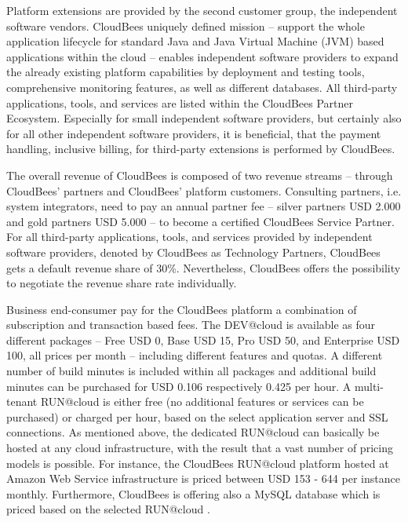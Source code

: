 Platform extensions are provided by the second customer group, the independent software vendors. CloudBees uniquely defined mission -- support the whole application lifecycle for standard Java and Java Virtual Machine (JVM) based applications within the cloud -- enables independent software providers to expand the already existing platform capabilities by deployment and testing tools, comprehensive monitoring features, as well as different databases. All third-party applications, tools, and services are listed within the CloudBees Partner Ecosystem. Especially for small independent software providers, but certainly also for all other independent software providers, it is beneficial, that the payment handling, inclusive billing, for third-party extensions is performed by CloudBees.

The overall revenue of CloudBees is composed of two revenue streams -- through CloudBees' partners and CloudBees' platform customers. Consulting partners, i.e. system integrators, need to pay an annual partner fee -- silver partners USD 2.000 and gold partners USD 5.000 -- to become a certified CloudBees Service Partner. For all third-party applications, tools, and services provided by independent software providers, denoted by CloudBees as Technology Partners, CloudBees gets a default revenue share of 30\%. Nevertheless, CloudBees offers the possibility to negotiate the revenue share rate individually.

Business end-consumer pay for the CloudBees platform a combination of subscription and transaction based fees. The DEV@cloud is available as four different packages -- Free USD 0, Base USD 15, Pro USD 50, and Enterprise USD 100, all prices per month -- including different features and quotas. A different number of build minutes is included within all packages and additional build minutes can be purchased for USD 0.106 respectively 0.425 per hour. A multi-tenant RUN@cloud is either free (no additional features or services can be purchased) or charged per hour, based on the select application server and SSL connections. As mentioned above, the dedicated RUN@cloud can basically be hosted at any cloud infrastructure, with the result that a vast number of pricing models is possible. For instance, the CloudBees RUN@cloud platform hosted at Amazon Web Service infrastructure is priced between USD 153 - 644 per instance monthly. Furthermore, CloudBees is offering also a MySQL database which is priced based on the selected RUN@cloud \citep{CloudBees2013}.



